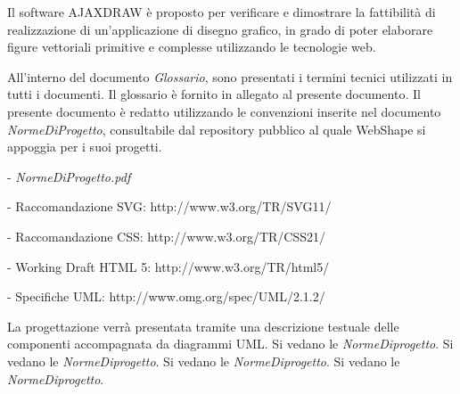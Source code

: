 Il software AJAXDRAW \`e proposto per verificare e dimostrare la fattibilit\`a di realizzazione di un'applicazione di disegno grafico, in grado di poter elaborare figure vettoriali primitive e complesse utilizzando le tecnologie web.

All'interno del documento \textit{Glossario}, sono presentati i termini tecnici utilizzati in tutti i documenti. Il glossario \`e fornito in allegato al presente documento.
Il presente documento \`e redatto utilizzando le convenzioni inserite nel documento \textit{NormeDiProgetto}, consultabile dal repository pubblico al quale WebShape si appoggia per i suoi progetti.
\begin{elencopuntato}[\subsubsecindent]
\item[-] \textit{NormeDiProgetto.pdf}
\item[-] Raccomandazione SVG: http://www.w3.org/TR/SVG11/
\item[-] Raccomandazione CSS: http://www.w3.org/TR/CSS21/
\item[-] Working Draft HTML 5: http://www.w3.org/TR/html5/
\item[-] Specifiche UML: http://www.omg.org/spec/UML/2.1.2/
\end{elencopuntato}

La progettazione verr\`a presentata tramite una descrizione testuale delle componenti accompagnata da diagrammi UML.
Si vedano le \textit{NormeDiprogetto}.
Si vedano le \textit{NormeDiprogetto}.
Si vedano le \textit{NormeDiprogetto}.
Si vedano le \textit{NormeDiprogetto}.




